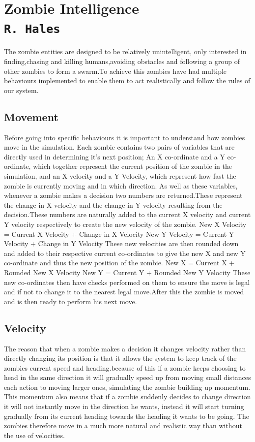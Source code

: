 \pagestyle{empty}
\section{Zombie Intelligence\\{\small\tt{R.~Hales}}}
The zombie entities are designed to be relatively unintelligent, only interested in finding,chasing and killing humans,avoiding obstacles and following a group of other zombies to form a swarm.To achieve this zombies have had multiple behaviours implemented to enable them to act realistically and follow the rules of our system.
\subsection{Movement}
Before going into specific behaviours it is important to understand how zombies move in the simulation. Each zombie contains two pairs of variables that are directly used in determining it's next position; An X co-ordinate and a Y co-ordinate, which together represent the current position of the zombie in the simulation, and an X velocity and a Y Velocity, which represent how fast the zombie is currently moving and in which direction.
As well as these variables, whenever a zombie makes a decision two numbers are returned.These represent the change in X velocity and the change in Y velocity resulting from the decision.These numbers are naturally added to the current X velocity and current Y velocity respectively to create the new velocity of the zombie.
	New X Velocity = Current X Velocity + Change in X Velocity
	New Y Velocity = Current Y Velocity + Change in Y Velocity
These new velocities are then rounded down and added to their respective current co-ordinates to give the new X and new Y co-ordinate and thus the new position of the zombie.
	New X = Current X + Rounded New X Velocity
	New Y = Current Y + Rounded New Y Velocity
These new co-ordinates then have checks performed on them to ensure the move is legal and if not to change it to the nearest legal move.After this the zombie is moved and is then ready to perform his next move.
\subsection{Velocity} 
The reason that when a zombie makes a decision it changes velocity rather than directly changing its position is that it allows the system to keep track of the zombies current speed and heading.because of this if a zombie keeps choosing to head in the same direction it will gradually speed up from moving small distances each action to moving larger ones, simulating the zombie building up momentum. This momentum also means that if a zombie suddenly decides to change direction it will not instantly move in the direction he wants, instead it will start turning gradually from its current heading towards the heading it wants to be going. The zombies therefore move in a much more natural and realistic way than without the use of velocities.

